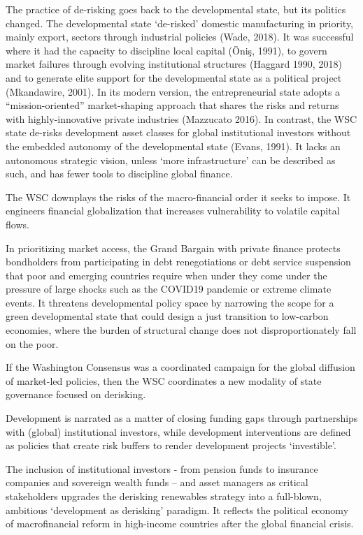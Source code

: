 \documentclass[
]{book}
\begin{document}
The practice of de-risking goes back to the developmental state, but its politics changed.
The developmental state `de-risked' domestic manufacturing in priority, mainly export,
sectors through industrial policies (Wade, 2018). It was successful where it had the
capacity to discipline local capital (Öniş, 1991), to govern market failures through
evolving institutional structures (Haggard 1990, 2018) and to generate elite support for
the developmental state as a political project (Mkandawire, 2001). In its modern
version, the entrepreneurial state adopts a ``mission-oriented'' market-shaping approach
that shares the risks and returns with highly-innovative private industries (Mazzucato
2016). In contrast, the WSC state de-risks development asset classes for global
institutional investors without the embedded autonomy of the developmental state
(Evans, 1991). It lacks an autonomous strategic vision, unless `more infrastructure' can
be described as such, and has fewer tools to discipline global finance.

The WSC downplays the risks of the macro-financial order it seeks to impose. It
engineers financial globalization that increases vulnerability to volatile capital flows.

In prioritizing market access, the Grand Bargain with private finance
protects bondholders from participating in debt renegotiations or debt service
suspension that poor and emerging countries require when under they come under the
pressure of large shocks such as the COVID19 pandemic or extreme climate events.
It threatens developmental policy space by narrowing the
scope for a green developmental state that could design a just transition to low-carbon
economies, where the burden of structural change does not disproportionately fall on
the poor.

If the Washington Consensus was a coordinated campaign for the global diffusion of
market-led policies, then the WSC coordinates a new modality of state governance
focused on derisking.

Development is narrated as a matter of closing funding gaps
through partnerships with (global) institutional investors,
while development interventions are defined as policies that
create risk buffers to render development projects `investible'.

The inclusion of institutional investors - from pension funds to insurance companies
and sovereign wealth funds -- and asset managers as critical stakeholders upgrades the
derisking renewables strategy into a full-blown, ambitious `development as derisking'
paradigm.
It reflects the political economy of macrofinancial reform in high-income countries
after the global financial crisis.
\end{document}
